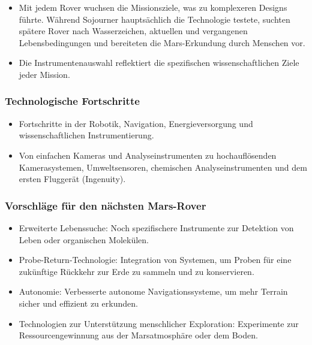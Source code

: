 \documentclass{vorlage-design-main}
\begin{document}
\begin{itemize}

\item
  Mit jedem Rover wuchsen die Missionsziele, was zu komplexeren Designs
  führte. Während Sojourner hauptsächlich die Technologie testete,
  suchten spätere Rover nach Wasserzeichen, aktuellen und vergangenen
  Lebensbedingungen und bereiteten die Mars-Erkundung durch Menschen
  vor.
\item
  Die Instrumentenauswahl reflektiert die spezifischen
  wissenschaftlichen Ziele jeder Mission.
\end{itemize}

\hypertarget{technologische-fortschritte}{%
\subsubsection{Technologische
Fortschritte}\label{technologische-fortschritte}}

\begin{itemize}

\item
  Fortschritte in der Robotik, Navigation, Energieversorgung und
  wissenschaftlichen Instrumentierung.
\item
  Von einfachen Kameras und Analyseinstrumenten zu hochauflösenden
  Kamerasystemen, Umweltsensoren, chemischen Analyseinstrumenten und dem
  ersten Fluggerät (Ingenuity).
\end{itemize}

\hypertarget{vorschluxe4ge-fuxfcr-den-nuxe4chsten-mars-rover}{%
\subsubsection{Vorschläge für den nächsten
Mars-Rover}\label{vorschlaege-fuer-den-naechsten-mars-rover}}

\begin{itemize}

\item
  Erweiterte Lebenssuche: Noch spezifischere Instrumente zur Detektion
  von Leben oder organischen Molekülen.
\item
  Probe-Return-Technologie: Integration von Systemen, um Proben für eine
  zukünftige Rückkehr zur Erde zu sammeln und zu konservieren.
\item
  Autonomie: Verbesserte autonome Navigationssysteme, um mehr Terrain
  sicher und effizient zu erkunden.
\item
  Technologien zur Unterstützung menschlicher Exploration: Experimente
  zur Ressourcengewinnung aus der Marsatmosphäre oder dem Boden.
\end{itemize}
\end{document}
